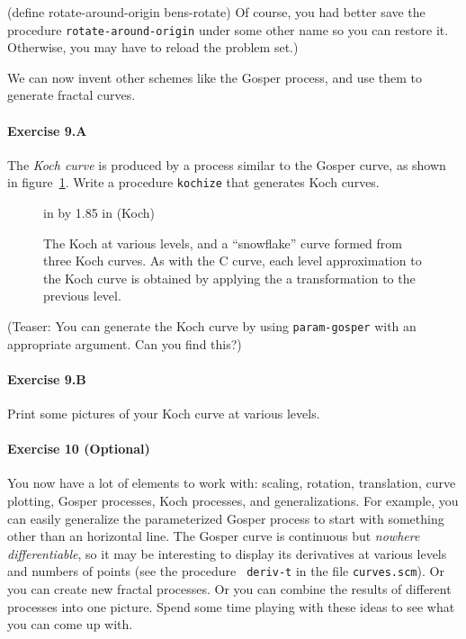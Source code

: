 \beginlisp
(define rotate-around-origin bens-rotate)
\endlisp
Of course, you had better save the procedure {\tt rotate-around-origin}
under some other name so you can restore it.  Otherwise, you may have to
reload the problem set.)

\medskip

We can now invent other schemes like the Gosper process, and use them
to generate fractal curves.

\paragraph{Exercise 9.A}  The {\em Koch curve} is produced by a
process similar to the Gosper curve, as shown in figure~\ref{Koch}.
Write a procedure {\tt kochize} that generates Koch curves.

\begin{figure}
 in by 1.85 in (Koch)
\caption{{\protect\footnotesize
The Koch at various levels, and a ``snowflake'' curve formed from
three Koch curves.  As with the C curve, each level approximation
to the Koch curve is obtained by
applying the a transformation to the previous level.}}
\label{Koch}
\end{figure}

(Teaser: You can generate the Koch curve by using {\tt param-gosper} with
an appropriate argument.  Can you find this?)


\paragraph{Exercise 9.B} Print some pictures of your Koch curve at
various levels.

\paragraph{Exercise 10 (Optional)}

You now have a lot of elements to work with: scaling, rotation,
translation, curve plotting, Gosper processes, Koch processes, and
generalizations.  For example, you can easily generalize the
parameterized Gosper process to start with something other than an
horizontal line.  The Gosper curve is continuous but {\em nowhere
differentiable}, so it may be interesting to display its derivatives
at various levels and numbers of points (see the procedure {\tt
deriv-t} in the file {\tt curves.scm}).  Or you can create new fractal
processes.  Or you can combine the results of different processes into
one picture.  Spend some time playing with these ideas to see what you
can come up with.


